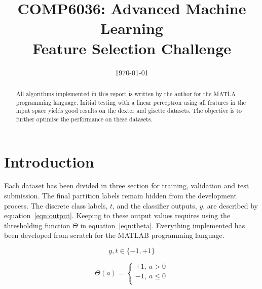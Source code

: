 \documentclass{ecsarticle}     %
\begin{document}
\frontmatter
\title      {COMP6036: Advanced Machine Learning\\
            Feature Selection Challenge}
      
\addresses  {\deptname\\\univname}

\date       {\today}
\subject    {}
\keywords   {}
\maketitle


\begin{abstract}
All algorithms implemented in this report is written by the author for the MATLA programming language.
Initial testing with a linear perceptron using all features in the input space yields good results on the dexter and gisette datasets.
The objective is to further optimise the performance on these datasets. 
\end{abstract}

\mainmatter


\section{Introduction}

Each dataset has been divided in three section for training, validation and test submission.
The final partition labels remain hidden from the development process.
The discrete class labels, $t$, and the classifier outputs, $y$, are described by equation~\eqref{eqn:output}.
Keeping to these output values requires using the thresholding function $\Theta$ in equation~\eqref{eqn:theta}. 
Everything implemented has been developed from scratch for the MATLAB programming language. 


\begin{equation}
	y,t \in \{-1,+1\}
	\label{eqn:output}
\end{equation}

\begin{equation}
	\Theta(a) = \left\{ 
      \begin{array}{l}
         +1,\:a > 0\\
         -1,\:a \leq 0\\
      \end{array} \right.	
	\label{eqn:theta}
\end{equation}
\end{document}

